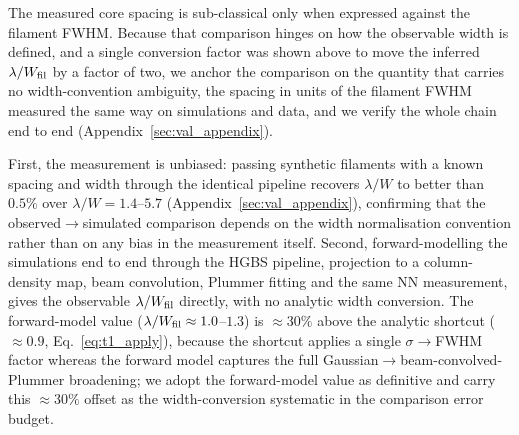 \documentclass[usenatbib,twoside,twocolumn]{mnras}
\begin{document}
The measured core spacing is sub-classical only when expressed against the filament FWHM. Because that comparison hinges on how the observable width is defined, and a single conversion factor was shown above to move the inferred $\lambda/W_{\rm fil}$ by a factor of two, we anchor the comparison on the quantity that carries no width-convention ambiguity, the spacing in units of the filament FWHM measured the same way on simulations and data, and we verify the whole chain end to end (Appendix~\ref{sec:val_appendix}).

First, the measurement is unbiased: passing synthetic filaments with a known spacing and width through the identical pipeline recovers $\lambda/W$ to better than $0.5\%$ over $\lambda/W=1.4$--$5.7$ (Appendix~\ref{sec:val_appendix}), confirming that the observed$\to$simulated comparison depends on the width normalisation convention rather than on any bias in the measurement itself. Second, forward-modelling the simulations end to end through the HGBS pipeline, projection to a column-density map, beam convolution, Plummer fitting and the same NN measurement, gives the observable $\lambda/W_{\rm fil}$ directly, with no analytic width conversion. The forward-model value ($\lambda/W_{\rm fil}\approx1.0$--$1.3$) is $\approx30\%$ above the analytic shortcut ($\approx0.9$, Eq.~\ref{eq:t1_apply}), because the shortcut applies a single $\sigma\!\to\!$FWHM factor whereas the forward model captures the full Gaussian$\to$beam-convolved-Plummer broadening; we adopt the forward-model value as definitive and carry this $\approx30\%$ offset as the width-conversion systematic in the comparison error budget.
\end{document}
